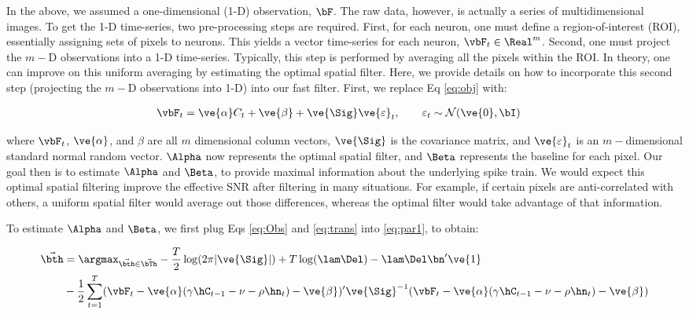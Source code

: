 In the above, we assumed a one-dimensional (1-D) observation, $\bF$.  The raw data, however, is actually a series of multidimensional images. To get the 1-D time-series, two pre-processing steps are required.  First, for each neuron, one must define a region-of-interest (ROI), essentially assigning sets of pixels to neurons. This yields a vector time-series for each neuron, $\vbF_t \in \Real^m$.   Second, one must project the $m-$D observations into a 1-D time-series.  Typically, this step is performed by averaging all the pixels within the ROI.  In theory, one can improve on this uniform averaging by estimating the optimal spatial filter. Here, we provide details on how to incorporate this second step (projecting the $m-$D observations into 1-D) into our fast filter. First, we replace Eq \eqref{eq:obj} with:

\begin{align}
\vbF_t &= \ve{\alpha} C_t + \ve{\beta} +  \ve{\Sig} \ve{\varepsilon}_t, \qquad \varepsilon_t \sim \mathcal{N}(\ve{0},\bI) \label{eq:Obs} 
\end{align}

\noindent where $\vbF_t$, $\ve{\alpha}$, and $\beta$ are all $m$ dimensional column vectors, $\ve{\Sig}$ is the covariance matrix, and $\ve{\varepsilon}_t$ is an $m-$dimensional standard normal random vector. $\Alpha$ now represents the optimal spatial filter, and $\Beta$ represents the baseline for each pixel.  Our goal then is to estimate $\Alpha$ and $\Beta$, to provide maximal information about the underlying spike train.  We would expect this optimal spatial filtering improve the effective SNR after filtering in many situations.  For example, if certain pixels are anti-correlated with others, a uniform spatial filter would average out those differences, whereas the optimal filter would take advantage of that information.    

To estimate $\Alpha$ and $\Beta$, we first plug 
Eqs \eqref{eq:Obs} and \eqref{eq:trans} into \eqref{eq:par1}, to obtain:

\begin{align} 
\vec{\bth} &=\argmax_{\vec{\bth} \in \vec{\bTh}} - \frac{T}{2} \log (2\pi|\ve{\Sig}|) + T\log (\lam \Del) -  \lam \Del \bn' \ve{1} \nonumber\\
&-\frac{1}{2} \sum_{t=1}^T (\vbF_t - \ve{\alpha} (\gamma \hC_{t-1} -\nu  - \rho \hn_t) - \ve{\beta})' \ve{\Sig}^{-1} (\vbF_t - \ve{\alpha} (\gamma \hC_{t-1} -\nu  - \rho \hn_t) - \ve{\beta}) %
\end{align} 

